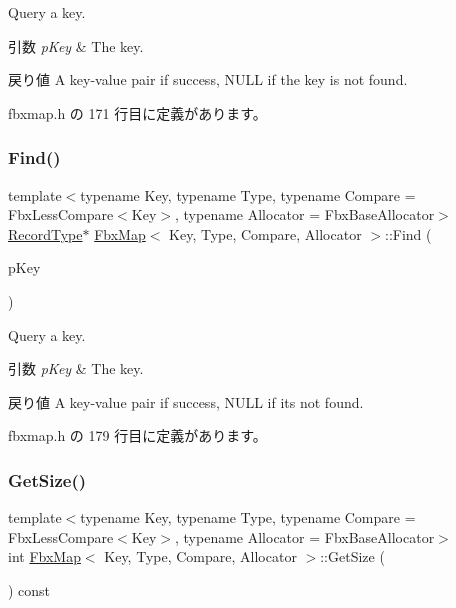 Query a key. 
\begin{DoxyParams}{引数}
{\em p\+Key} & The key. \\
\hline
\end{DoxyParams}
\begin{DoxyReturn}{戻り値}
A key-\/value pair if success, N\+U\+LL if the key is not found. 
\end{DoxyReturn}


 fbxmap.\+h の 171 行目に定義があります。

\mbox{\label{class_fbx_map_a3ed10339972bfa73f5123a871c1f7e5d}} 
\subsubsection{\texorpdfstring{Find()}{Find()}\hspace{0.1cm}{\footnotesize\ttfamily [2/2]}}
{\footnotesize\ttfamily template$<$typename Key, typename Type, typename Compare = Fbx\+Less\+Compare$<$\+Key$>$, typename Allocator = Fbx\+Base\+Allocator$>$ \\
\hyperlink{class_fbx_map_af8fc887461b3bf29f41aa36d15ddb54f}{Record\+Type}$\ast$ \hyperlink{class_fbx_map}{Fbx\+Map}$<$ Key, Type, Compare, Allocator $>$\+::Find (\begin{DoxyParamCaption}\item[{const \hyperlink{class_fbx_map_ad8392c83b6f8eeb9e0706bcc8674270a}{Key\+Type} \&}]{p\+Key }\end{DoxyParamCaption})\hspace{0.3cm}{\ttfamily [inline]}}

Query a key. 
\begin{DoxyParams}{引数}
{\em p\+Key} & The key. \\
\hline
\end{DoxyParams}
\begin{DoxyReturn}{戻り値}
A key-\/value pair if success, N\+U\+LL if it\textquotesingle{}s not found. 
\end{DoxyReturn}


 fbxmap.\+h の 179 行目に定義があります。

\mbox{\label{class_fbx_map_a0dcb49b244b4de4a27b4157a5915d2ae}} 
\subsubsection{\texorpdfstring{Get\+Size()}{GetSize()}}
{\footnotesize\ttfamily template$<$typename Key, typename Type, typename Compare = Fbx\+Less\+Compare$<$\+Key$>$, typename Allocator = Fbx\+Base\+Allocator$>$ \\
int \hyperlink{class_fbx_map}{Fbx\+Map}$<$ Key, Type, Compare, Allocator $>$\+::Get\+Size (\begin{DoxyParamCaption}{ }\end{DoxyParamCaption}) const\hspace{0.3cm}{\ttfamily [inline]}}



